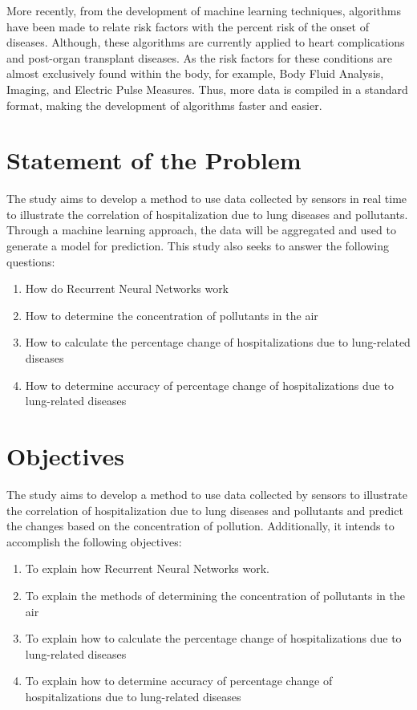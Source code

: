 \documentclass[10pt,11pt,12pt,oneside]{book}
\begin{document}
    More recently, from the development of machine learning techniques, algorithms have been made to relate risk factors with the percent risk of the onset of diseases. Although, these algorithms are currently applied to heart complications and post-organ transplant diseases. As the risk factors for these conditions are almost exclusively found within the body, for example, Body Fluid Analysis, Imaging, and Electric Pulse Measures. Thus, more data is compiled in a standard format, making the development of algorithms faster and easier. 
    \section{Statement of the Problem}
    
    The study aims to develop a method to use data collected by sensors in real time to illustrate the correlation of hospitalization due to lung diseases and pollutants. Through a machine learning approach, the data will be aggregated and used to generate a model for prediction. This study also seeks to answer the following questions:
    \begin{enumerate}
        \item How do Recurrent Neural Networks work
        \item How to determine the concentration of pollutants in the air
        \item How to calculate the percentage change of hospitalizations due to lung-related diseases
        \item How to determine accuracy of percentage change of hospitalizations due to lung-related diseases
    \end{enumerate}
    \section{Objectives}
    The study aims to develop a method to use data collected by sensors to illustrate the correlation of hospitalization due to lung diseases and pollutants and predict the changes based on the concentration of pollution. Additionally, it intends to accomplish the following objectives:
    \begin{enumerate}
        \item To explain how Recurrent Neural Networks work.
        \item To explain the methods of determining the concentration of pollutants in the air
        \item To explain how to calculate the percentage change of hospitalizations due to lung-related diseases
        \item To explain how to determine accuracy of percentage change of hospitalizations due to lung-related diseases 
    \end{enumerate}
\end{document}
